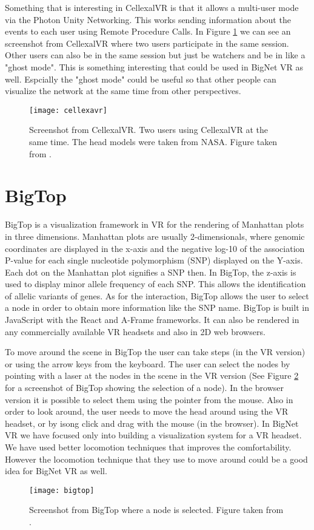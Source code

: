 Something that is interesting in CellexalVR is that it allows a multi-user mode via the Photon Unity Networking. This works sending information about the events to each user using Remote Procedure Calls. In Figure \ref{fig:cellexavr} we can see an screenshot from CellexalVR where two users participate in the same session. Other users can also be in the same session but just be watchers and be in like a "ghost mode". This is something interesting that could be used in BigNet VR as well. Espcially the "ghost mode" could be useful so that other people can visualize the network at the same time from other perspectives.

\begin{figure}[h!]
    \centering%
    \texttt{[image: cellexavr]}
    \caption{Screenshot from CellexalVR. Two users using CellexalVR at the same time. The head models were taken from NASA. Figure taken from \cite{cellexalvr}.}
    \label{fig:cellexavr}
\end{figure}%

\section{BigTop}
BigTop is a visualization framework in VR for the rendering of Manhattan plots in three dimensions\cite{bigtop}. Manhattan plots are usually 2-dimensionals, where genomic coordinates are displayed in the x-axis and the negative log-10 of the association P-value for each single nucleotide polymorphism (SNP) displayed on the Y-axis. Each dot on the Manhattan plot signifies a SNP then. In BigTop, the z-axis is used to display minor allele frequency of each SNP. This allows the identification of allelic variants of genes. As for the interaction, BigTop allows the user to select a node in order to obtain more information like the SNP name. BigTop is built in JavaScript with the React and A-Frame frameworks. It can also be rendered in any commercially available VR headsets and also in 2D web browsers.

To move around the scene in BigTop the user can take steps (in the VR version) or using the arrow keys from the keyboard. The user can select the nodes by pointing with a laser at the nodes in the scene in the VR version (See Figure \ref{fig:bigtop} for a screenshot of BigTop showing the selection of a node). In the browser version it is possible to select them using the pointer from the mouse. Also in order to look around, the user needs to move the head around using the VR headset, or by isong click and drag with the mouse (in the browser). In BigNet VR we have focused only into building a visualization system for a VR headset. We have used better locomotion techniques that improves the comfortability. However the locomotion technique that they use to move around could be a good idea for BigNet VR as well.

\begin{figure}[h!]
    \centering%
    \texttt{[image: bigtop]}
    \caption{Screenshot from BigTop where a node is selected. Figure taken from \cite{bigtop}.}
    \label{fig:bigtop}
\end{figure}%
